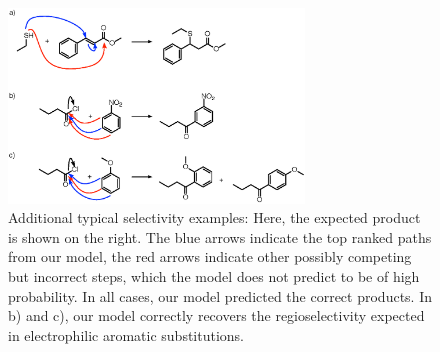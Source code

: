 \begin{figure}[h]
        \centering
        \includegraphics[width=0.7\textwidth]{imgs/textbook/additionalexamples.eps}
        \caption{Additional typical selectivity examples: Here, the expected product is shown on the right. The blue arrows indicate the top ranked paths from our model, the red arrows indicate other possibly competing but incorrect steps, which the model does not predict to be of high probability. In all cases, our model predicted the correct products. In b) and c), our model correctly recovers the regioselectivity expected in electrophilic aromatic substitutions.}
        \label{fig:extra-textbook-example2}
\end{figure}



